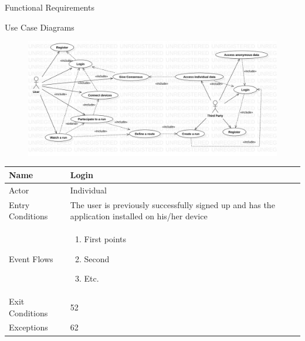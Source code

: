 \documentclass{article}
\begin{document}
\begin{legal}
\begin{legal}
    		\item Functional Requirements\\
    		\begin{legal}\bfseries
    			\item Use Case Diagrams
    			\begin{figure}[H]
			  	\includegraphics[width=\linewidth]{./images/usecase.jpg}
				\end{figure}
				\begin{tabular}{| m{3.5cm} | m{8cm}| }
				\hline
					Name & Login\\
				\hline
					Actor & Individual\\
				\hline
					Entry Conditions & The user is previously successfully signed up and has the application installed
				on his/her device\\
				\hline
					Event Flows & \begin{enumerate}
									  \item First points
									  \item Second
									  \item Etc.
				\end{enumerate}\\
				\hline
					Exit Conditions & 52\\
				\hline
					Exceptions & 62\\
				\hline
				\end{tabular}
    		\end{legal}
		\end{legal}

	\end{legal}
\end{document}
